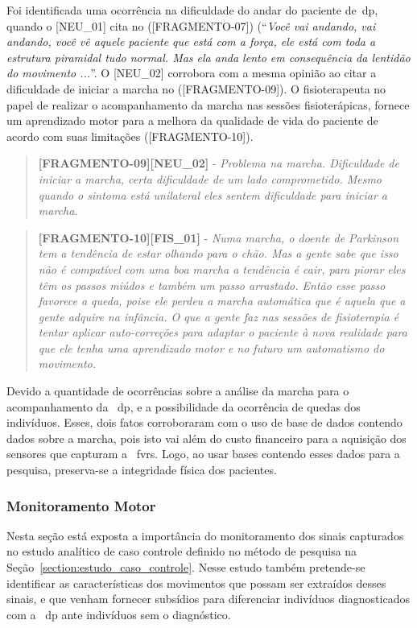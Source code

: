 Foi identificada uma ocorrência na dificuldade do andar do paciente de~\ac{dp}, quando o [NEU\_01] cita no ([FRAGMENTO-07]) (``\textit{Você vai andando, vai andando, você vê aquele paciente que está com a força, ele está com toda a estrutura piramidal tudo normal. Mas ela anda lento em consequência da lentidão do movimento ...}''. O [NEU\_02] corrobora com a mesma opinião ao citar a dificuldade de iniciar a marcha no ([FRAGMENTO-09]). O fisioterapeuta no papel de realizar o acompanhamento da marcha nas sessões fisioterápicas, fornece um aprendizado motor para a melhora da qualidade de vida do paciente de acordo com suas limitações ([FRAGMENTO-10]).

\begin{quote}
\textbf{[FRAGMENTO-09][NEU\_02]} - 
\emph{
Problema na marcha. Dificuldade de iniciar a marcha, certa dificuldade de um lado comprometido. Mesmo quando o sintoma está unilateral eles sentem dificuldade para iniciar a marcha.
}
\end{quote}

\begin{quote}
\textbf{[FRAGMENTO-10][FIS\_01]} - 
\emph{
Numa marcha, o doente de Parkinson tem a tendência de estar olhando para o chão. Mas a gente sabe que isso não é compatível com uma boa marcha a tendência é cair, para piorar eles têm os passos miúdos e também um passo arrastado. Então esse passo favorece a queda, poise ele perdeu a marcha automática que é aquela que a gente adquire na infância. O que a gente faz nas sessões de fisioterapia é tentar aplicar auto-correções para adaptar o paciente à nova realidade para que ele tenha uma aprendizado motor e no futuro um automatismo do movimento.
}
\end{quote}

Devido a quantidade de ocorrências sobre a análise da marcha para o acompanhamento da ~\ac{dp}, e a possibilidade da ocorrência de quedas dos indivíduos. Esses, dois fatos corroboraram com o uso de base de dados contendo dados sobre a marcha, pois isto vai além do custo financeiro para a aquisição dos sensores que capturam a ~\ac{fvrs}. Logo, ao usar bases contendo esses dados para a pesquisa, preserva-se a integridade física dos pacientes.



\subsubsection{Monitoramento Motor}
Nesta seção está exposta a importância do monitoramento dos sinais capturados no estudo analítico de caso controle definido no método de pesquisa na Seção~\ref{section:estudo_caso_controle}. Nesse estudo também pretende-se identificar as características dos movimentos que possam ser extraídos desses sinais, e que venham fornecer subsídios para diferenciar indivíduos diagnosticados com a ~\ac{dp} ante indivíduos sem o diagnóstico.

